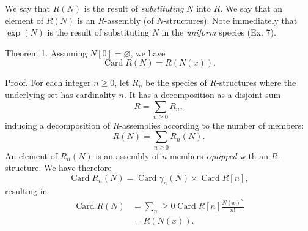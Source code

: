 \documentclass{article}
\theoremstyle{definition}
\theoremstyle{remark}
\DeclareMathOperator{\Card}{Card}
\newcommand{\term}[1]{\emph{#1}}
\begin{document}
We say that $R (N)$ is the result of \term{substituting} $N$ into $R$. We
say that an element of $R (N)$ is an $R$-assembly (of $N$-structures). Note
immediately that $\exp (N)$ is the result of substituting $N$ in
the \emph{uniform} species (Ex. 7).

Theorem 1. Assuming $N [0] = \varnothing$, we have
\[ \Card R (N) = R (N (x)). \]

Proof. For each integer $n \geq 0$, let $R_n$ be the species of $R$-structures
where the underlying set has cardinality $n$. It has a decomposition
as a disjoint sum
\[ R = \sum_{n \geq 0} R_n, \]
inducing a decomposition of $R$-assemblies according to the number of
members:
\[ R (N) = \sum_{n \geq 0} R_n(N). \]
An element of $R_n(N)$ is an assembly of $n$ members \emph{equipped} with an $R$-structure.
We have therefore
\[ \Card R_n(N) = \Card \gamma_n(N) \times \Card R [n], \]
resulting in
\begin{align*} \Card R(N) &= \sum_n \geq 0 \Card R[n]
  \frac{N(x)^n}{n!} \\
  &= R(N(x)).
\end{align*}



\end{document}
